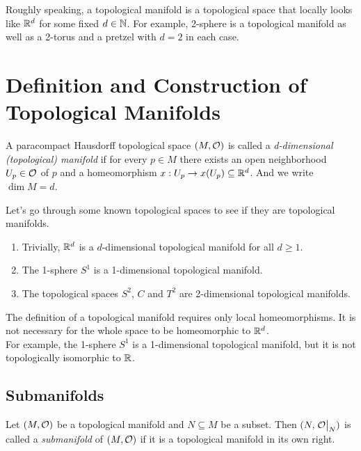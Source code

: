 
Roughly speaking, a topological manifold is a topological space that locally looks like \(\mathbb R^d\) for some fixed \(d \in \mathbb N\). For example, 2-sphere is a topological manifold as well as a 2-torus and a pretzel with \(d = 2\) in each case.

\section{Definition and Construction of Topological Manifolds}

\begin{definition}
	A paracompact Hausdorff topological space \((M, \mathcal{O})\) is called a \emph{d-dimensional (topological) manifold} if for every \(p \in M\) there exists an open neighborhood \(U_p \in \mathcal{O}\) of \(p\) and a homeomorphism \(x: U_p \to x(U_p) \subseteq \mathbb R^d\). And we write \(\dim{M} = d\).
\end{definition}

\begin{example}
	Let's go through some known topological spaces to see if they are topological manifolds.
	\begin{enumerate}
		\item Trivially, \(\mathbb R^d\) is a \(d\)-dimensional topological manifold for all \(d \ge 1\).
		\item The 1-sphere \(S^1\) is a 1-dimensional topological manifold.
		\item The topological spaces \(S^2\), \(C\) and \(T^2\) are 2-dimensional topological manifolds.
	\end{enumerate}
\end{example}

\begin{remark}
	The definition of a topological manifold requires only local homeomorphisms. It is not necessary for the whole space to be homeomorphic to \(\mathbb R^d\). \\
	For example, the 1-sphere \(S^1\) is a 1-dimensional topological manifold, but it is not topologically isomorphic to \(\mathbb R\).
\end{remark}

\subsection{Submanifolds}

\begin{definition}[Submanifold]
	Let \((M, \mathcal{O})\) be a topological manifold and \(N \subseteq M\) be a subset. Then \((N, \eval{\O}_N)\) is called a \emph{submanifold} of \((M, \mathcal{O})\) if it is a topological manifold in its own right.
\end{definition}

